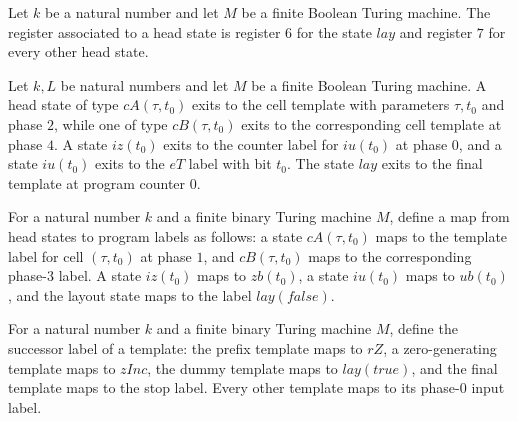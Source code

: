 \begin{definition}
\label{Complexity.UTab.Hd.reg}
\leanok
{}
Let $k$ be a natural number and let $M$ be a finite Boolean Turing machine. The register
associated to a head state is register $6$ for the state $lay$ and register $7$ for
every other head state.
\end{definition}

\begin{definition}
\label{Complexity.UTab.Hd.exit}
\leanok
{}
Let $k,L$ be natural numbers and let $M$ be a finite Boolean Turing machine. A head
state of type $cA(\tau,t_0)$ exits to the cell template with parameters $\tau,t_0$ and
phase $2$, while one of type $cB(\tau,t_0)$ exits to the corresponding cell template at
phase $4$. A state $iz(t_0)$ exits to the counter label for $iu(t_0)$ at phase $0$, and
a state $iu(t_0)$ exits to the $eT$ label with bit $t_0$. The state $lay$ exits to the
final template at program counter $0$.
\end{definition}

\begin{definition}
\label{Complexity.UTab.Hd.body}
\leanok
{}
For a natural number $k$ and a finite binary Turing machine $M$, define a map from head
states to program labels as follows: a state $cA(\tau,t_0)$ maps to the template label
for cell $(\tau,t_0)$ at phase $1$, and $cB(\tau,t_0)$ maps to the corresponding
phase-$3$ label. A state $iz(t_0)$ maps to $zb(t_0)$, a state $iu(t_0)$ maps to
$ub(t_0)$, and the layout state maps to the label $lay(false)$.
\end{definition}

\begin{definition}
\label{Complexity.UTab.Tpl.next}
\leanok
{}
For a natural number $k$ and a finite binary Turing machine $M$, define the successor
label of a template: the prefix template maps to $rZ$, a zero-generating template maps
to $zInc$, the dummy template maps to $lay(true)$, and the final template maps to the
stop label. Every other template maps to its phase-$0$ input label.
\end{definition}

